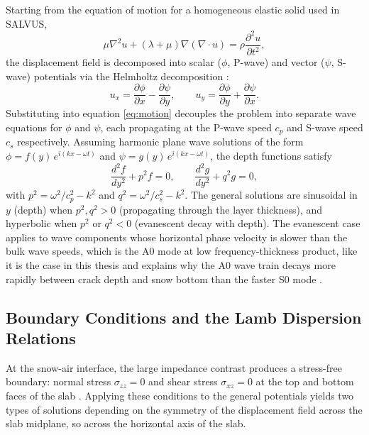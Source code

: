 Starting from the equation of motion for a homogeneous elastic solid used in SALVUS,
\begin{equation}
    \mu \nabla^2 u + (\lambda + \mu) \nabla (\nabla \cdot u) = 
    \rho \frac{\partial^2 u}{\partial t^2},
    \label{eq:motion}
\end{equation}
the displacement field is decomposed into scalar ($\phi$, P-wave) and vector 
($\psi$, S-wave) potentials via the Helmholtz decomposition 
\parencite{achenbachWavePropagationElastic2012}:
\begin{equation}
    u_x = \frac{\partial \phi}{\partial x} - \frac{\partial \psi}{\partial y}, 
    \qquad 
    u_y = \frac{\partial \phi}{\partial y} + \frac{\partial \psi}{\partial x}.
\end{equation}
Substituting into equation \ref{eq:motion} decouples the problem into 
separate wave equations for $\phi$ and $\psi$, each propagating at the 
P-wave speed $c_p$ and S-wave speed $c_s$ respectively. Assuming harmonic 
plane wave solutions of the form $\phi = f(y)\,e^{i(kx-\omega t)}$ and 
$\psi = g(y)\,e^{i(kx-\omega t)}$, the depth functions satisfy
\begin{equation}
    \frac{d^2f}{dy^2} + p^2 f = 0, \qquad 
    \frac{d^2g}{dy^2} + q^2 g = 0,
\end{equation}
with $p^2 = \omega^2/c_p^2 - k^2$ and $q^2 = \omega^2/c_s^2 - k^2$. The 
general solutions are sinusoidal in $y$  (depth) when $p^2, q^2 > 0$ (propagating through the layer thickness), and hyperbolic when $p^2$ or $q^2 < 0$ (evanescent decay with depth). The evanescent case applies to wave components whose horizontal phase velocity is slower than the bulk wave speeds, which is the A0 mode at low frequency-thickness product, like it is the case in this thesis and explains why the A0 wave train decays more rapidly between crack depth and snow bottom than the faster S0 mode \parencite{graffWaveMotionElastic1975}. \par

\subsection{Boundary Conditions and the Lamb Dispersion Relations}

At the snow-air interface, the large impedance contrast produces a stress-free boundary: normal stress $\sigma_{zz} = 0$ and shear stress $\sigma_{xz} = 0$ at the top and bottom faces of the slab \parencite{igelComputationalSeismologyPractical2016}. Applying these conditions to the general potentials yields two types of solutions depending on the symmetry of the displacement field across the slab midplane, so across the horizontal axis of the slab. \par

